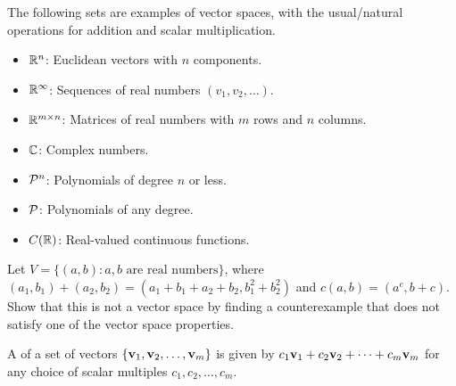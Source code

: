 
\begin{applicationActivities}{2}{8}

\begin{remark}
  The following sets are examples of vector spaces, with the usual/natural
  operations for addition and scalar multiplication.
  \begin{itemize}
    \item \(\IR^n\): Euclidean vectors with \(n\) components.
    \item \(\IR^\infty\): Sequences of real numbers \((v_1,v_2,\dots)\).
    \item \(\IR^{m\times n}\): Matrices of real numbers with \(m\) rows and
          \(n\) columns.
    \item \(\IC\): Complex numbers.
    \item \(\P^n\): Polynomials of degree \(n\) or less.
    \item \(\P\): Polynomials of any degree.
    \item \(C(\IR)\): Real-valued continuous functions.
  \end{itemize}
\end{remark}

\begin{activity}{10}
  Let \(V=\{(a,b):a,b\text{ are real numbers}\}\), where \((a_1,b_1)+(a_2,b_2)=
  (a_1+b_1+a_2+b_2,b_1^2+b_2^2)\) and \(c(a,b)=(a^c,b+c)\). Show that
  this is not a vector space by finding a counterexample
  that does not satisfy one of the vector space properties.

  \vectorSpaceProperties
\end{activity}

\begin{definition}
  A  of a set of vectors
  \(\{\vect v_1,\vect v_2,\dots,\vect v_m\}\) is given by
  \(c_1\vect v_1+c_2\vect v_2+\dots+c_m\vect v_m\) for any choice of
  scalar multiples \(c_1,c_2,\dots,c_m\).

	\ \\
	\ \\


\end{definition}
\end{applicationActivities}
